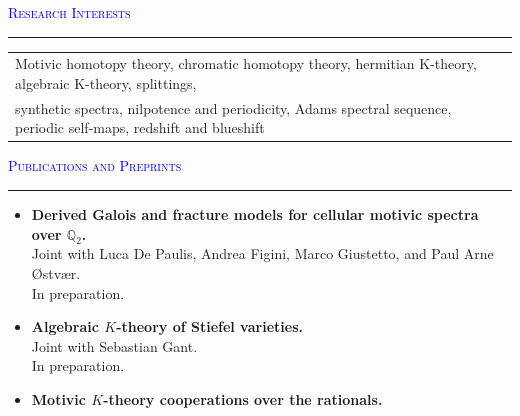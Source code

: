\documentclass[10pt]{article}
\newcommand{\grey}[1]{\textcolor{cvgrey}{#1}}
\newenvironment{rSection}[1]{ %
  \medskip
  {\large\scshape\textcolor{Blue}{#1}} %
  \smallskip
  \hrule %
  \begin{list}{}{ %
    \setlength{\leftmargin}{0em} %
  }
  \item[]
}{
  \end{list}
}
\begin{document}
\begin{rSection}{Research Interests}
\begin{tabular}{l}
    Motivic homotopy theory, chromatic homotopy theory, hermitian K-theory, algebraic K-theory,  splittings,\\
    synthetic spectra, nilpotence and periodicity, Adams spectral sequence, periodic self-maps, redshift and blueshift
\end{tabular}
\end{rSection}

\begin{rSection}{Publications and Preprints}
\begin{itemize}
    \item[10.] \textbf{Derived Galois and fracture models for cellular motivic spectra over $\mathbb{Q}_2$.}\\
    Joint with Luca De Paulis, Andrea Figini, Marco Giustetto, and Paul Arne \O stv\ae r.\\
    \grey{In preparation.}
    \item[9.] \textbf{Algebraic $K$-theory of Stiefel varieties.}\\
    Joint with Sebastian Gant.\\
    \grey{In preparation.}
    \item[8.] \textbf{Motivic $K$-theory cooperations over the rationals.}\\

\end{itemize}
\end{rSection}
\end{document}
